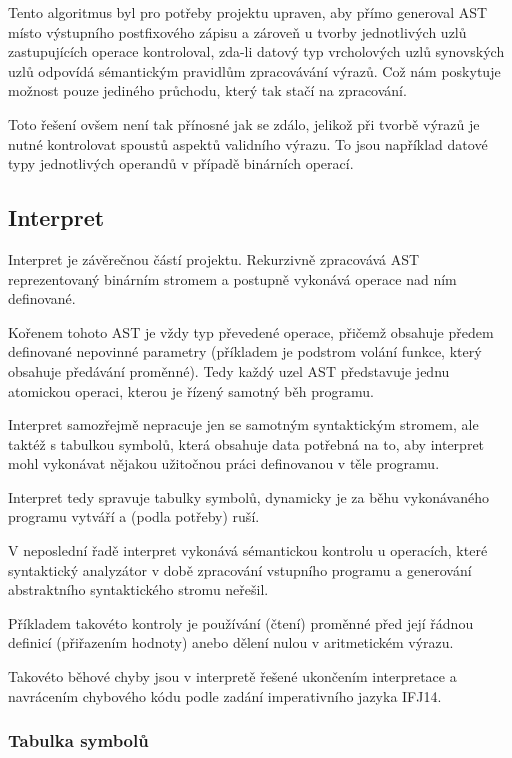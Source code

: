\documentclass[12pt,a4paper,titlepage,final]{article}
\begin{document}
Tento algoritmus byl pro potřeby projektu upraven, aby přímo generoval AST místo
výstupního postfixového zápisu a zároveň u tvorby jednotlivých uzlů zastupujících
operace kontroloval, zda-li datový typ vrcholových uzlů synovských uzlů odpovídá
sémantickým pravidlům zpracovávání výrazů. Což nám poskytuje možnost pouze jediného průchodu, který tak stačí na zpracování.

Toto řešení ovšem není tak přínosné jak se zdálo, jelikož při tvorbě výrazů je nutné kontrolovat spoustů aspektů validního výrazu. To jsou
například datové typy jednotlivých operandů v případě binárních operací.

\subsection{Interpret} \label{interpret}

Interpret je závěrečnou částí projektu. Rekurzivně zpracovává AST reprezentovaný
binárním stromem a postupně vykonává operace nad ním definované.

Kořenem tohoto AST je vždy typ převedené operace, přičemž obsahuje předem
definované nepovinné parametry (příkladem je podstrom volání funkce, který
obsahuje předávání proměnné). Tedy každý uzel AST představuje jednu atomickou
operaci, kterou je řízený samotný běh programu.

Interpret samozřejmě nepracuje jen se samotným syntaktickým stromem, ale
taktéž s tabulkou symbolů, která obsahuje data potřebná na to, aby interpret
mohl vykonávat nějakou užitočnou práci definovanou v těle programu.

Interpret tedy spravuje tabulky symbolů, dynamicky je za běhu
vykonávaného programu vytváří a (podla potřeby) ruší.

V neposlední řadě interpret vykonává sémantickou kontrolu u operacích, které
syntaktický analyzátor v době zpracování vstupního programu a generování
abstraktního syntaktického stromu neřešil.

Příkladem takovéto kontroly je používání (čtení) proměnné před její řádnou
definicí (přiřazením hodnoty) anebo dělení nulou v aritmetickém výrazu.

Takovéto běhové chyby jsou v interpretě řešené ukončením interpretace a navrácením
chybového kódu podle zadání imperativního jazyka IFJ14.

\subsubsection{Tabulka symbolů} \label{tabulka_symbolu}
\end{document}
